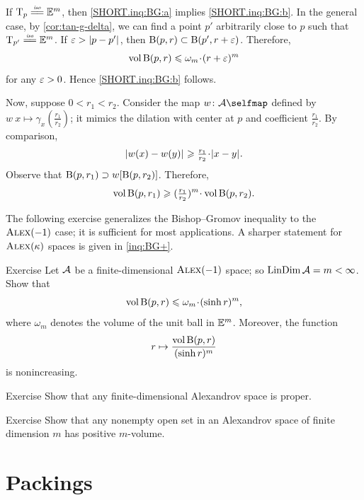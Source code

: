 If $\T_p\iso \EE^m$, then \ref{SHORT.inq:BG:a} implies \ref{SHORT.inq:BG:b}.
In the general case, by \ref{cor:tan-g-delta}, we can find a point $p'$ arbitrarily close to $p$ such that $\T_{p'}\iso \EE^m$.
If $\eps>\dist{p}{p'}{}$, then $\oBall(p,r)\z\subset \oBall(p',r+\eps)$.
Therefore,
\[\vol \oBall(p,r)\le \omega_m\cdot (r+\eps)^m\]
for any $\varepsilon>0$.
Hence \ref{SHORT.inq:BG:b} follows.

Now, suppose $0<r_1<r_2$.
Consider the map $w\: \spc{A}\selfmap$ defined by $w\:x\mapsto \gamma_x(\tfrac {r_1}{r_2})$; it mimics the dilation with center at $p$ and coefficient $\tfrac {r_1}{r_2}$.
By comparison,
\[\dist{w(x)}{w(y)}{}\ge \tfrac {r_1}{r_2}\cdot \dist{x}{y}{}.\]
Observe that $\mathrm{B}{}(p,r_1) \supset w[\mathrm{B}{}(p,r_2)]$.
Therefore,
\[\vol \oBall(p,r_1)\ge (\tfrac {r_1}{r_2})^m\cdot\vol \oBall(p,r_2).\]
\qedsf

The following exercise generalizes the Bishop--Gromov inequality to the $\textup{\textsc{Alex}}(-1)$ case;
it is sufficient for most applications.
A sharper statement for $\textup{\textsc{Alex}}(\kappa)$ spaces is given in \ref{inq:BG+}.



\begin{thm}[!]{Exercise}\label{ex:BG}
Let $\mathcal{A}$ be a finite-dimensional $\textup{\textsc{Alex}}(-1)$ space;
so $\mathop{\rm LinDim}\nolimits\mathcal{A}=m<\infty$.
Show that
\[\vol \oBall(p,r)\le \omega_m\cdot(\sinh r)^m,\]
where $\omega_m$ denotes the volume of the unit ball in $\mathbb{E}^m$.
Moreover, the function
\[r\mapsto \frac{\operatorname{\rm vol}\nolimits \mathrm{B}{}(p,r)}{(\sinh r)^m}\]
is nonincreasing.
\end{thm}

\begin{thm}[!]{Exercise}\label{ex:diam-compact:proper}
Show that any finite-dimensional Alexandrov space is proper.

\end{thm}

\begin{thm}{Exercise}\label{ex:vol>0}
Show that any nonempty open set in an Alexandrov space of finite dimension $m$ has positive $m$-volume.
\end{thm}


\section{Packings}\label{sec:packing-numbers}


